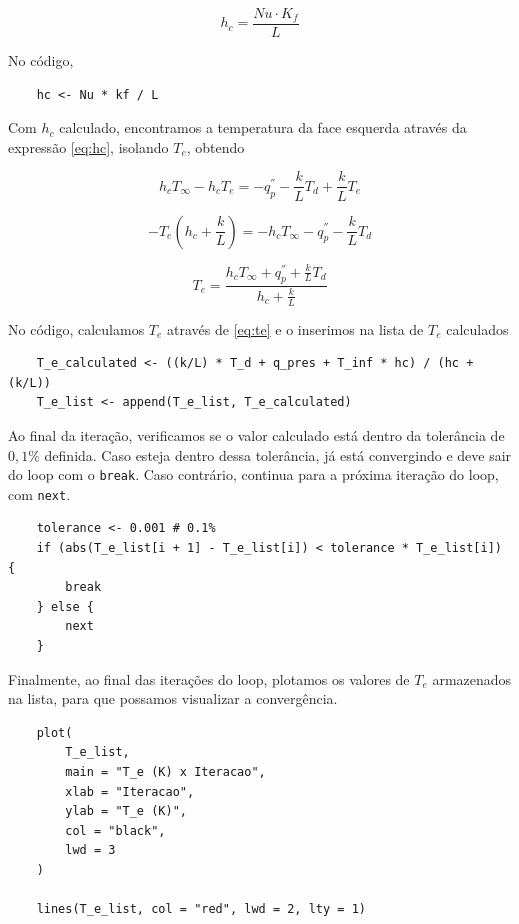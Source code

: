 \documentclass[12pt]{scrartcl}
\newcommand{\code}[1]{\texttt{#1}}
\begin{document}
\begin{equation}\label{eq:hc_Nu}
    h_c = \frac{Nu \cdot K_f}{L}
\end{equation}

No código, 

\begin{lstlisting}
    hc <- Nu * kf / L
\end{lstlisting}

Com $h_c$ calculado, encontramos a temperatura da face esquerda
através da expressão \eqref{eq:hc}, isolando $T_e$, obtendo

\[ h_cT_{\infty} - h_cT_e = - q_{p}^{''} - \frac{k}{L}T_d + \frac{k}{L}T_e \]

\[  - T_e\left(h_c + \frac{k}{L}\right) = - h_cT_{\infty} - q_{p}^{''} - \frac{k}{L}T_d \]

\begin{equation}\label{eq:te}
    T_e = \frac{h_cT_{\infty} + q_{p}^{''} + \frac{k}{L}T_d}{h_c + \frac{k}{L}}
\end{equation}

No código, calculamos $T_e$ através de \eqref{eq:te} e o inserimos na lista de $T_e$ calculados

\begin{lstlisting}
    T_e_calculated <- ((k/L) * T_d + q_pres + T_inf * hc) / (hc + (k/L))
    T_e_list <- append(T_e_list, T_e_calculated)
\end{lstlisting}

Ao final da iteração, verificamos se o valor calculado está dentro da tolerância de $0,1\%$
definida. Caso esteja dentro dessa tolerância, já está convergindo e deve sair do loop com o
\code{break}. Caso contrário, continua para a próxima iteração do loop, com \code{next}.

\begin{lstlisting}
    tolerance <- 0.001 # 0.1% 
    if (abs(T_e_list[i + 1] - T_e_list[i]) < tolerance * T_e_list[i]) {
        break
    } else {
        next
    }
\end{lstlisting}

Finalmente, ao final das iterações do loop, plotamos os valores de $T_e$ armazenados na lista,
para que possamos visualizar a convergência.

\begin{lstlisting}
    plot(
        T_e_list,
        main = "T_e (K) x Iteracao",
        xlab = "Iteracao",
        ylab = "T_e (K)",
        col = "black",
        lwd = 3
    )
      
    lines(T_e_list, col = "red", lwd = 2, lty = 1)
\end{lstlisting}
\end{document}
